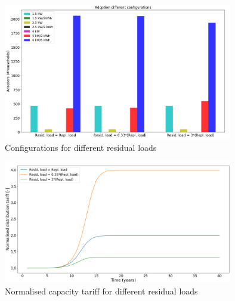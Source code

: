 \noindent
\newline 
\begin{figure}[h!]
    \centering
    \includegraphics[width=10cm]{AppendixA/ConfigSubsresid.PNG}
    \caption{Configurations for different residual loads}
    \label{fig:O}
\end{figure}
\noindent
\newline
\begin{figure}[h!]
    \centering
    \includegraphics[width=10cm]{AppendixA/DistSubsresid.PNG}
    \caption{Normalised capacity tariff for different residual loads}
    \label{fig:P}
\end{figure}
